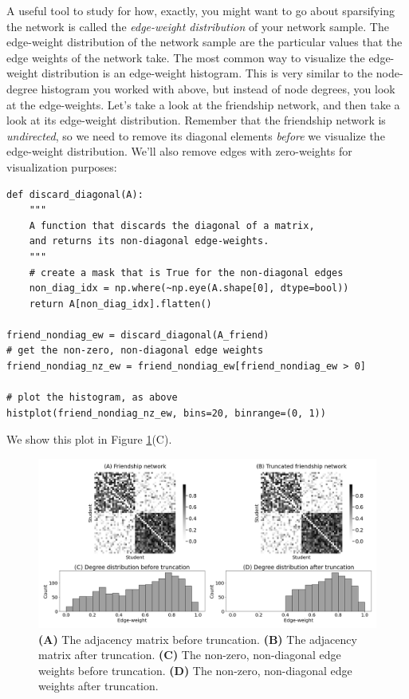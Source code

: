 A useful tool to study for how, exactly, you might want to go about sparsifying the network is called the \emph{edge-weight distribution} of your network sample. The edge-weight distribution of the network sample are the particular values that the edge weights of the network take. The most common way to visualize the edge-weight distribution is an edge-weight histogram. This is very similar to the node-degree histogram you worked with above, but instead of node degrees, you look at the edge-weights. Let's take a look at the friendship network, and then take a look at its edge-weight distribution. Remember that the friendship network is \emph{undirected}, so we need to remove its diagonal elements \emph{before} we visualize the edge-weight distribution. We'll also remove edges with zero-weights for visualization purposes:

\begin{lstlisting}[style=python]
def discard_diagonal(A):
    """
    A function that discards the diagonal of a matrix,
    and returns its non-diagonal edge-weights.
    """
    # create a mask that is True for the non-diagonal edges
    non_diag_idx = np.where(~np.eye(A.shape[0], dtype=bool))
    return A[non_diag_idx].flatten()

friend_nondiag_ew = discard_diagonal(A_friend)
# get the non-zero, non-diagonal edge weights
friend_nondiag_nz_ew = friend_nondiag_ew[friend_nondiag_ew > 0]

# plot the histogram, as above
histplot(friend_nondiag_nz_ew, bins=20, binrange=(0, 1))
\end{lstlisting}
We show this plot in Figure \ref{fig:ch4:truncate}(C).

\begin{figure}[h]
    \centering
    \includegraphics[width=\linewidth]{representations/ch4/Images/truncate.png}
    \caption[Truncation]{\textbf{(A)} The adjacency matrix before truncation. \textbf{(B)} The adjacency matrix after truncation. \textbf{(C)} The non-zero, non-diagonal edge weights before truncation. \textbf{(D)} The non-zero, non-diagonal edge weights after truncation.}
    \label{fig:ch4:truncate}
\end{figure}


